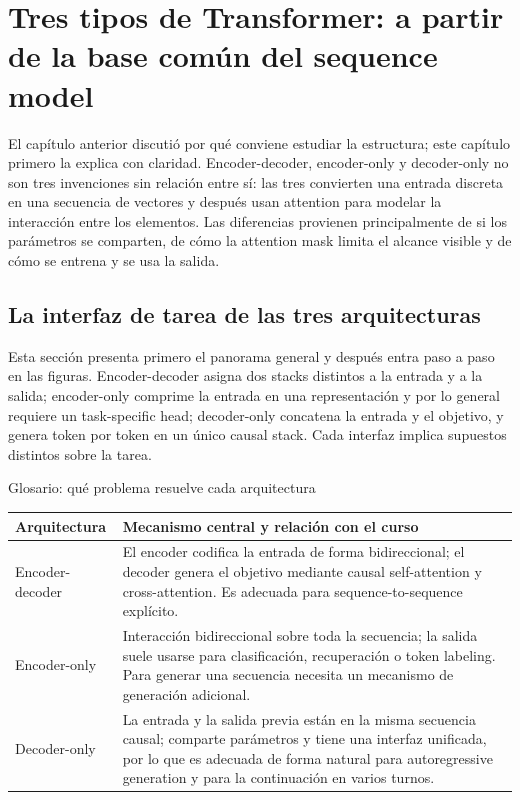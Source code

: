 \section{Tres tipos de Transformer: a partir de la base común del sequence model}

El capítulo anterior discutió por qué conviene estudiar la estructura; este capítulo primero la explica con claridad. Encoder-decoder, encoder-only y decoder-only no son tres invenciones sin relación entre sí: las tres convierten una entrada discreta en una secuencia de vectores y después usan attention para modelar la interacción entre los elementos. Las diferencias provienen principalmente de si los parámetros se comparten, de cómo la attention mask limita el alcance visible y de cómo se entrena y se usa la salida.

\subsection{La interfaz de tarea de las tres arquitecturas}

Esta sección presenta primero el panorama general y después entra paso a paso en las figuras. Encoder-decoder asigna dos stacks distintos a la entrada y a la salida; encoder-only comprime la entrada en una representación y por lo general requiere un task-specific head; decoder-only concatena la entrada y el objetivo, y genera token por token en un único causal stack. Cada interfaz implica supuestos distintos sobre la tarea.


\begin{knowledgebox}{Glosario: qué problema resuelve cada arquitectura}
\begin{tabularx}{\textwidth}{L{0.22\textwidth} X}
\toprule
Arquitectura & Mecanismo central y relación con el curso \\
\midrule
Encoder-decoder & El encoder codifica la entrada de forma bidireccional; el decoder genera el objetivo mediante causal self-attention y cross-attention. Es adecuada para sequence-to-sequence explícito. \\
Encoder-only & Interacción bidireccional sobre toda la secuencia; la salida suele usarse para clasificación, recuperación o token labeling. Para generar una secuencia necesita un mecanismo de generación adicional. \\
Decoder-only & La entrada y la salida previa están en la misma secuencia causal; comparte parámetros y tiene una interfaz unificada, por lo que es adecuada de forma natural para autoregressive generation y para la continuación en varios turnos. \\
\bottomrule
\end{tabularx}
\end{knowledgebox}

